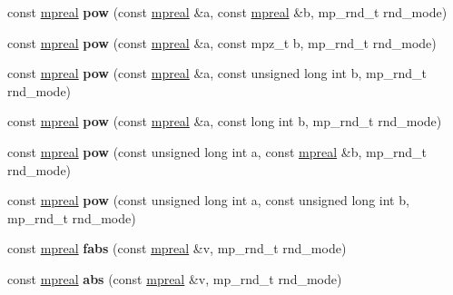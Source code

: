 \begin{DoxyCompactItemize}
const \hyperlink{classmpfr_1_1mpreal}{mpreal} {\bfseries pow} (const \hyperlink{classmpfr_1_1mpreal}{mpreal} \&a, const \hyperlink{classmpfr_1_1mpreal}{mpreal} \&b, mp\+\_\+rnd\+\_\+t rnd\+\_\+mode)
\item 
\mbox{\label{classmpfr_1_1mpreal_a954ad4fba81d78a48f3ec41067f737b0}} 
const \hyperlink{classmpfr_1_1mpreal}{mpreal} {\bfseries pow} (const \hyperlink{classmpfr_1_1mpreal}{mpreal} \&a, const mpz\+\_\+t b, mp\+\_\+rnd\+\_\+t rnd\+\_\+mode)
\item 
\mbox{\label{classmpfr_1_1mpreal_a2dc7712c222b7e255b18add7483d7e8d}} 
const \hyperlink{classmpfr_1_1mpreal}{mpreal} {\bfseries pow} (const \hyperlink{classmpfr_1_1mpreal}{mpreal} \&a, const unsigned long int b, mp\+\_\+rnd\+\_\+t rnd\+\_\+mode)
\item 
\mbox{\label{classmpfr_1_1mpreal_ae6be4eeffa69e1ad6040c1c5179aad7f}} 
const \hyperlink{classmpfr_1_1mpreal}{mpreal} {\bfseries pow} (const \hyperlink{classmpfr_1_1mpreal}{mpreal} \&a, const long int b, mp\+\_\+rnd\+\_\+t rnd\+\_\+mode)
\item 
\mbox{\label{classmpfr_1_1mpreal_ab307ff53337bdf1ba9ad90f3cbc7034c}} 
const \hyperlink{classmpfr_1_1mpreal}{mpreal} {\bfseries pow} (const unsigned long int a, const \hyperlink{classmpfr_1_1mpreal}{mpreal} \&b, mp\+\_\+rnd\+\_\+t rnd\+\_\+mode)
\item 
\mbox{\label{classmpfr_1_1mpreal_adbe2050d3b632bbbbc2fedecea82e038}} 
const \hyperlink{classmpfr_1_1mpreal}{mpreal} {\bfseries pow} (const unsigned long int a, const unsigned long int b, mp\+\_\+rnd\+\_\+t rnd\+\_\+mode)
\item 
\mbox{\label{classmpfr_1_1mpreal_a15f52ba5582f9fbae7a15ff1f53c5af8}} 
const \hyperlink{classmpfr_1_1mpreal}{mpreal} {\bfseries fabs} (const \hyperlink{classmpfr_1_1mpreal}{mpreal} \&v, mp\+\_\+rnd\+\_\+t rnd\+\_\+mode)
\item 
\mbox{\label{classmpfr_1_1mpreal_aa4f1f7be7933232e833fbe9a86ba74a3}} 
const \hyperlink{classmpfr_1_1mpreal}{mpreal} {\bfseries abs} (const \hyperlink{classmpfr_1_1mpreal}{mpreal} \&v, mp\+\_\+rnd\+\_\+t rnd\+\_\+mode)

\end{DoxyCompactItemize}
